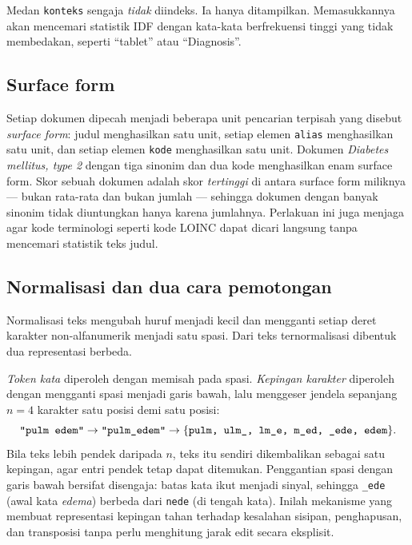 \documentclass[journal,twoside,web]{ieeecolor}
\begin{document}
Medan \texttt{konteks} sengaja \emph{tidak} diindeks. Ia hanya ditampilkan.
Memasukkannya akan mencemari statistik IDF dengan kata-kata berfrekuensi tinggi
yang tidak membedakan, seperti ``tablet'' atau ``Diagnosis''.

\subsection{Surface form}

Setiap dokumen dipecah menjadi beberapa unit pencarian terpisah yang disebut
\emph{surface form}: judul menghasilkan satu unit, setiap elemen \texttt{alias}
menghasilkan satu unit, dan setiap elemen \texttt{kode} menghasilkan satu unit.
Dokumen \emph{Diabetes mellitus, type 2} dengan tiga sinonim dan dua kode
menghasilkan enam surface form. Skor sebuah dokumen adalah skor \emph{tertinggi}
di antara surface form miliknya --- bukan rata-rata dan bukan jumlah --- sehingga
dokumen dengan banyak sinonim tidak diuntungkan hanya karena jumlahnya.
Perlakuan ini juga menjaga agar kode terminologi seperti kode LOINC
\cite{mcdonald2003} dapat dicari langsung tanpa mencemari statistik teks judul.

\subsection{Normalisasi dan dua cara pemotongan}

Normalisasi teks mengubah huruf menjadi kecil dan mengganti setiap deret karakter
non-alfanumerik menjadi satu spasi. Dari teks ternormalisasi dibentuk dua
representasi berbeda.

\emph{Token kata} diperoleh dengan memisah pada spasi. \emph{Kepingan karakter}
diperoleh dengan mengganti spasi menjadi garis bawah, lalu menggeser jendela
sepanjang $n = 4$ karakter satu posisi demi satu posisi:
\[
\text{\texttt{"pulm edem"}} \rightarrow \text{\texttt{"pulm\_edem"}}
\rightarrow \{\text{\texttt{pulm, ulm\_, lm\_e, m\_ed, \_ede, edem}}\}.
\]
Bila teks lebih pendek daripada $n$, teks itu sendiri dikembalikan sebagai satu
kepingan, agar entri pendek tetap dapat ditemukan. Penggantian spasi dengan garis
bawah bersifat disengaja: batas kata ikut menjadi sinyal, sehingga
\texttt{\_ede} (awal kata \emph{edema}) berbeda dari \texttt{nede} (di tengah
kata). Inilah mekanisme yang membuat representasi kepingan tahan terhadap
kesalahan sisipan, penghapusan, dan transposisi \cite{damerau1964,
wagner1974} tanpa perlu menghitung jarak edit secara eksplisit.
\end{document}
